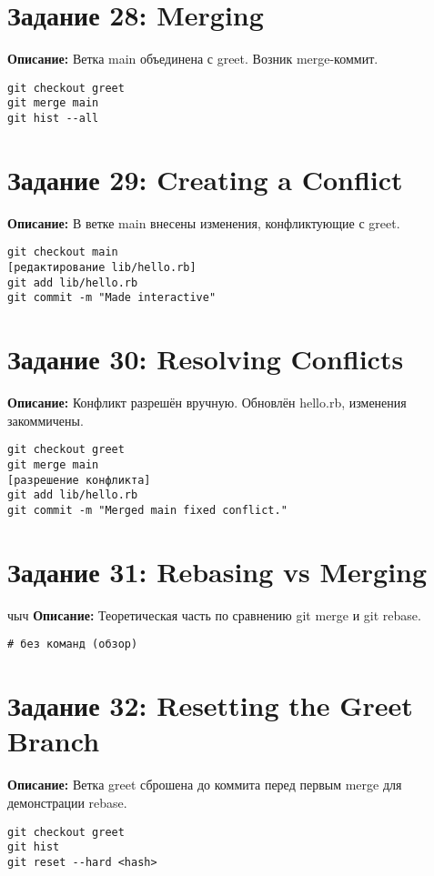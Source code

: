 \documentclass[a4paper,12pt]{report}
\begin{document}
\section*{Задание 28: Merging}
\textbf{Описание:} Ветка main объединена с greet. Возник merge-коммит.
\begin{verbatim}
git checkout greet
git merge main
git hist --all
\end{verbatim}

\section*{Задание 29: Creating a Conflict}
\textbf{Описание:} В ветке main внесены изменения, конфликтующие с greet.
\begin{verbatim}
git checkout main
[редактирование lib/hello.rb]
git add lib/hello.rb
git commit -m "Made interactive"
\end{verbatim}

\section*{Задание 30: Resolving Conflicts}
\textbf{Описание:} Конфликт разрешён вручную. Обновлён hello.rb, изменения закоммичены.
\begin{verbatim}
git checkout greet
git merge main
[разрешение конфликта]
git add lib/hello.rb
git commit -m "Merged main fixed conflict."
\end{verbatim}

\section*{Задание 31: Rebasing vs Merging}чыч
\textbf{Описание:} Теоретическая часть по сравнению git merge и git rebase.
\begin{verbatim}
# без команд (обзор)
\end{verbatim}

\section*{Задание 32: Resetting the Greet Branch}
\textbf{Описание:} Ветка greet сброшена до коммита перед первым merge для демонстрации rebase.
\begin{verbatim}
git checkout greet
git hist
git reset --hard <hash>
\end{verbatim}
\end{document}
